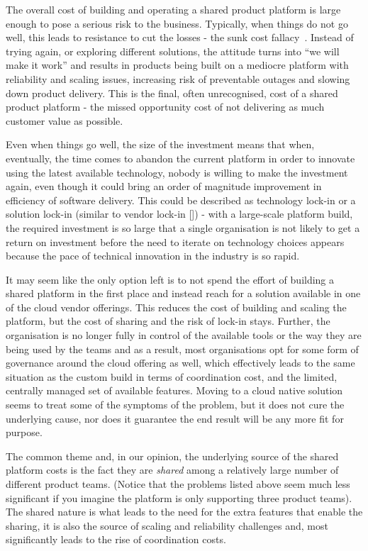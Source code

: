 \documentclass[reprint,amsmath,amssymb,aps]{revtex4-1}
\begin{document}
The overall cost of building and operating a shared product platform is large enough to pose a serious risk to the business. Typically, when things do not go well, this leads to resistance to cut the losses - the sunk cost fallacy~\cite{TheSunkC23:online}. Instead of trying again, or exploring different solutions, the attitude turns into “we will make it work” and results in products being built on a mediocre platform with reliability and scaling issues, increasing risk of preventable outages and slowing down product delivery. This is the final, often unrecognised, cost of a shared product platform - the missed opportunity cost of not delivering as much customer value as possible.

Even when things go well, the size of the investment means that when, eventually, the time comes to abandon the current platform in order to innovate using the latest available technology, nobody is willing to make the investment again, even though it could bring an order of magnitude improvement in efficiency of software delivery. This could be described as technology lock-in or a solution lock-in (similar to vendor lock-in []) - with a large-scale platform build, the required investment is so large that a single organisation is not likely to get a return on investment before the need to iterate on technology choices appears because the pace of technical innovation in the industry is so rapid.

It may seem like the only option left is to not spend the effort of building a shared platform in the first place and instead reach for a solution available in one of the cloud vendor offerings. This reduces the cost of building and scaling the platform, but the cost of sharing and the risk of lock-in stays. Further, the organisation is no longer fully in control of the available tools or the way they are being used by the teams and as a result, most organisations opt for some form of governance around the cloud offering as well, which effectively leads to the same situation as the custom build in terms of coordination cost, and the limited, centrally managed set of available features. Moving to a cloud native solution seems to treat some of the symptoms of the problem, but it does not cure the underlying cause, nor does it guarantee the end result will be any more fit for purpose.

The common theme and, in our opinion, the underlying source of the shared platform costs is the fact they are \textit{shared} among a relatively large number of different product teams. (Notice that the problems listed above seem much less significant if you imagine the platform is only supporting three product teams). The shared nature is what leads to the need for the extra features that enable the sharing, it is also the source of scaling and reliability challenges and, most significantly leads to the rise of coordination costs.
\end{document}
